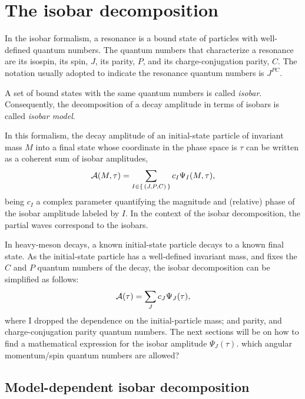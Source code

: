\section{The isobar decomposition}

    In the isobar formalism, a resonance is a bound state of particles with well-defined quantum numbers.
    The quantum numbers that characterize a resonance are its isospin, its spin, $J$, its parity, $P$, and its charge-conjugation parity, $C$.
    The notation usually adopted to indicate the resonance quantum numbers is $J^{PC}$.


    A set of bound states with the same quantum numbers is called \emph{isobar}.
    Consequently, the decomposition of a decay amplitude in terms of isobars is called \emph{isobar model}.

    In this formalism, the decay amplitude of an initial-state particle of invariant mass $M$ into a final state whose coordinate in the phase space is $\tau$ can be written as a coherent sum of isobar amplitudes,
    \begin{equation}\label{eq:isobar_decomposition}
        \mathcal{A}(M,\tau) = \sum_{I\in\set{(J, P, C)}} c_I \Psi_I(M, \tau),
    \end{equation}
    being $c_I$ a complex parameter quantifying the magnitude and (relative) phase of the isobar amplitude labeled by $I$.
    In the context of the isobar decomposition, the partial waves correspond to the isobars.


    In heavy-meson decays, a known initial-state particle decays to a known final state.
    As the initial-state particle has a well-defined invariant mass, and fixes the $C$ and $P$ quantum numbers of the decay, the isobar decomposition can be simplified as follows:
    \begin{equation}\label{eq:heavy_meson_isobar_decomposition}
        \mathcal{A}(\tau) = \sum_{J} c_J \Psi_J(\tau),
    \end{equation}
    where I dropped the dependence on the initial-particle mass; and parity, and charge-conjugation parity quantum numbers.
    The next sections will be on how to find a mathematical expression for the isobar amplitude $\Psi_J(\tau)$.
    {\color{red} which angular momentum/spin quantum numbers are allowed?}





    \subsection{Model-dependent isobar decomposition}

